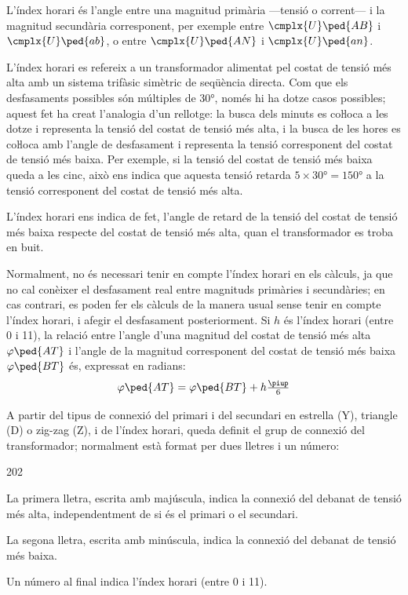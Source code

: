 L'índex horari és l'angle entre una magnitud  primària ---tensió o corrent--- i la magnitud secundària corresponent, per exemple entre $\cmplx{U}\ped{AB}$ i $\cmplx{U}\ped{ab}$, o entre $\cmplx{U}\ped{AN}$ i $\cmplx{U}\ped{an}$.

L'índex horari es refereix a un transformador alimentat pel costat de tensió més alta  amb un sistema trifàsic simètric de seqüència directa. Com que els desfasaments possibles són múltiples de \ang{30}, només hi ha dotze casos possibles; aquest fet ha creat l'analogia d'un rellotge: la busca dels minuts es coŀloca a les dotze i representa la tensió del costat de tensió més alta, i la busca de les hores es coŀloca amb l'angle de desfasament i representa la tensió corresponent del costat de tensió més baixa. Per exemple, si la tensió del costat de tensió més baixa queda a les cinc, això ens indica que aquesta tensió retarda $5\times \ang{30}= \ang{150}$ a la tensió corresponent del costat de tensió més alta.

L'índex horari ens indica de fet, l'angle de retard de la tensió del costat de tensió més baixa respecte del costat de tensió més alta, quan el transformador es troba en buit.

Normalment, no és necessari tenir en compte l'índex horari en els càlculs, ja que no cal conèixer el desfasament real entre magnituds primàries i secundàries; en cas contrari, es poden fer els càlculs de la manera usual sense tenir en compte l'índex horari, i afegir el desfasament posteriorment. Si $h$ és l'índex horari (entre 0 i 11), la relació entre l'angle d'una magnitud del costat de tensió més alta $\varphi\ped{AT}$ i l'angle de la magnitud corresponent del costat de tensió més baixa $\varphi\ped{BT}$ és, expressat en radians:
\begin{equation}
    \varphi\ped{AT} = \varphi\ped{BT} + h\tfrac{\piup}{6}\label{eq:fi-AT-BT}
\end{equation}


A partir del tipus de connexió del primari i del secundari en estrella (Y), triangle (D) o zig-zag (Z), i de l'índex horari, queda definit el grup de connexió del transformador; normalment està format per dues lletres i un número:
\begin{dingautolist}{202}
   \item La primera lletra, escrita amb majúscula, indica la connexió del debanat de tensió més alta, independentment de si és el primari o el secundari.
   \item La segona lletra, escrita amb minúscula, indica la connexió del debanat de tensió més baixa.
   \item Un número al final indica l'índex horari (entre 0 i 11).
\end{dingautolist}

